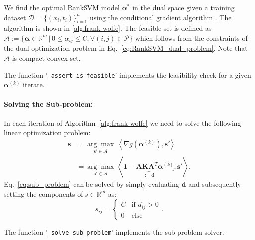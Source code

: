 \documentclass[10p]{article}
\newcommand{\defi}{:=}
\newcommand{\balpha}{\boldsymbol{\alpha}}
\newcommand{\bones}{\mathbf{1}}
\newcommand{\numexp}{n}
\newcommand{\numpair}{m}
\newcommand{\Pset}{\mathcal{P}}
\begin{document}
We find the optimal RankSVM model $\balpha^*$ in the dual space given a training dataset $\mathcal{D}=\{(x_i,t_i)\}_{i=1}^\numexp$ using the conditional gradient algorithm \parencite{Jaggi2013}. The algorithm is shown in \ref{alg:frank-wolfe}. The feasible set is defined as $\mathcal{A}\defi\{\balpha\in\mathbb{R}^\numpair\,|\,0\leq\alpha_{ij}\leq C,\forall (i,j)\in\Pset\}$ which follows from the constraints of the dual optimization problem in Eq.~\eqref{eq:RankSVM_dual_problem}. Note that $\mathcal{A}$ is compact convex set.
\begin{mdframed}[style=codeframe]
    The function '\texttt{\_assert\_is\_feasible}' implements the feasibility check for a given $\balpha^{(k)}$ iterate.
\end{mdframed}

\paragraph{Solving the Sub-problem:}
In each iteration of Algorithm~\ref{alg:frank-wolfe} we need to solve the following linear optimization problem:
\begin{align}
    \mathbf{s}
        &=\underset{\mathbf{s}'\in\mathcal{A}}{\arg\max}\,\left\langle\nabla g(\balpha^{(k)}),\mathbf{s}'\right\rangle\\
        &=\underset{\mathbf{s}'\in\mathcal{A}}{\arg\max}\,\left\langle\underbrace{\bones-\mathbf{A}\mathbf{K}\mathbf{A}^T\balpha^{(k)}}_{\defi\mathbf{d}},\mathbf{s}'\right\rangle.\label{eq:sub_problem}
\end{align}
Eq.~\eqref{eq:sub_problem} can be solved by simply evaluating $\mathbf{d}$ and subsequently setting the components of $s\in\mathbb{R}^{\numpair}$ as:
\begin{equation}
    s_{ij}=\begin{cases}
            C&\text{if }d_{ij}>0\\
            0&\text{else}
           \end{cases}.
\end{equation}
\begin{mdframed}[style=codeframe]
    The function '\texttt{\_solve\_sub\_problem}' implements the sub problem solver.
\end{mdframed}
\end{document}
